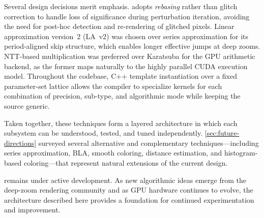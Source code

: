 Several design decisions merit emphasis.  \FractalShark{} adopts
\emph{rebasing} rather than glitch correction to handle loss of
significance during perturbation iteration, avoiding the need for
post-hoc detection and re-rendering of glitched pixels.  Linear
approximation version~2 (LA~v2) was chosen over series approximation
for its period-aligned skip structure, which enables longer effective
jumps at deep zooms.  NTT-based multiplication was preferred over
Karatsuba for the GPU arithmetic backend, as the former maps naturally
to the highly parallel CUDA execution model.  Throughout the
codebase, C++ template instantiation over a fixed parameter-set
lattice allows the compiler to specialize kernels for each combination
of precision, sub-type, and algorithmic mode while keeping the source
generic.

Taken together, these techniques form a layered architecture in which
each subsystem can be understood, tested, and tuned independently.
\cref{sec:future-directions} surveyed several alternative and
complementary techniques---including series approximation, BLA,
smooth coloring, distance estimation, and histogram-based coloring---that represent
natural extensions of the current design.

\FractalShark{} remains under active development.  As new algorithmic
ideas emerge from the deep-zoom rendering community and as GPU
hardware continues to evolve, the architecture described here provides
a foundation for continued experimentation and improvement.
